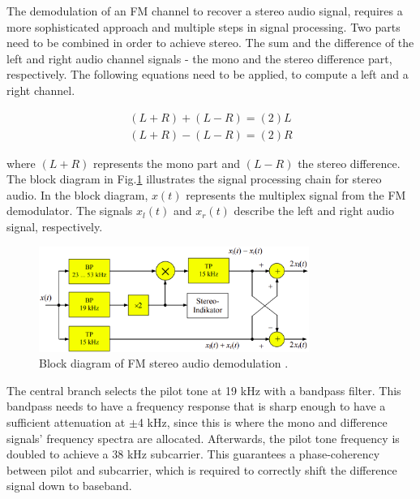 The demodulation of an FM channel to recover a stereo audio signal, requires a more sophisticated approach and multiple steps in signal processing.
Two parts need to be combined in order to achieve stereo.
The sum and the difference of the left and right audio channel signals - the mono and the stereo difference part, respectively.
The following equations need to be applied, to compute a left and a right channel.

\begin{equation}
  \begin{split}
    (L+R) + (L-R) = (2)L \\
    (L+R) - (L-R) = (2)R
    \label{equ_stereo_from_sum_diff}
  \end{split}
\end{equation}

where $(L+R)$ represents the mono part and $(L-R)$ the stereo difference.\\

The block diagram in Fig.\ref{fig_bd_stereo_demod} illustrates the signal processing chain for stereo audio.
In the block diagram, $x(t)$ represents the multiplex signal from the FM demodulator.
The signals $x_l(t)$ and $x_r(t)$ describe the left and right audio signal, respectively.\\

\begin{figure}[!h]
  \centering
    \includegraphics[width=8.8cm]{img/fm-demod-stereo-audio.png}
  \caption{Block diagram of FM stereo audio demodulation \cite{ref_roppel}.}
  \label{fig_bd_stereo_demod}
\end{figure}

The central branch selects the pilot tone at 19 kHz with a bandpass filter.
This bandpass needs to have a frequency response that is sharp enough to have a sufficient attenuation at $\pm$4 kHz, since this is where the mono and difference signals' frequency spectra are allocated.
Afterwards, the pilot tone frequency is doubled to achieve a 38 kHz subcarrier.
This guarantees a phase-coherency between pilot and subcarrier, which is required to correctly shift the difference signal down to baseband.

